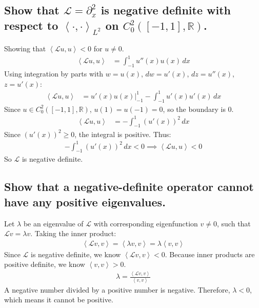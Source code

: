 \documentclass[11pt]{article}
\begin{document}
    \subsection{Show that $\mathcal{L}=\partial_x^2$ is negative definite with respect to $\left<\cdot, \cdot\right>_{L^2}$ on $C_0^2([-1,1],\mathbb{R})$.}
    Showing that $\left<\mathcal{L}u,u\right> < 0$ for $u \neq 0$.
    \begin{align*}
        \left<\mathcal{L}u,u\right> &= \int_{-1}^{1} u''(x)u(x) \,dx
    \end{align*}
    Using integration by parts with $w=u(x)$, $dw=u'(x)$, $dz=u''(x)$, $z=u'(x)$:
    \begin{align*}
        \left<\mathcal{L}u,u\right> &= u'(x)u(x)\Big|_{-1}^{1} - \int_{-1}^{1} u'(x)u'(x) \,dx
    \end{align*}
    Since $u \in C_0^2([-1,1],\mathbb{R})$, $u(1)=u(-1)=0$, so the boundary is 0.
    \begin{align*}
        \left<\mathcal{L}u,u\right> &= - \int_{-1}^{1} (u'(x))^2 \,dx
    \end{align*}
    Since $(u'(x))^2 \ge 0$, the integral is positive.
    Thus:
    \begin{gather*}
        - \int_{-1}^{1} (u'(x))^2 \,dx < 0 \implies \left<\mathcal{L}u,u\right> < 0
    \end{gather*}
    So $\mathcal{L}$ is negative definite.

    \subsection{Show that a negative-definite operator cannot have any positive eigenvalues.}
    Let $\lambda$ be an eigenvalue of $\mathcal{L}$ with corresponding eigenfunction $v \neq 0$, such that $\mathcal{L}v = \lambda v$.
    Taking the inner product:
    \begin{gather*}
        \left<\mathcal{L}v,v\right> = \left<\lambda v,v\right> = \lambda \left<v,v\right>
    \end{gather*}
    Since $\mathcal{L}$ is negative definite, we know $\left<\mathcal{L}v,v\right> < 0$. Because inner products are positive definite, we know $\left<v,v\right> > 0$.
    \begin{gather*}
        \lambda = \frac{\left<\mathcal{L}v,v\right>}{\left<v,v\right>}
    \end{gather*}
    A negative number divided by a positive number is negative.
    Therefore, $\lambda < 0$, which means it cannot be positive.
\end{document}
